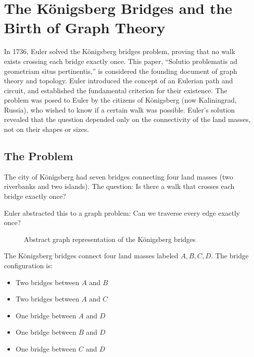 
\chapter{The K\"{o}nigsberg Bridges and the Birth of Graph Theory}

\begin{historical}
In 1736, Euler solved the K\"{o}nigsberg bridges problem, proving that no walk exists crossing
each bridge exactly once. This paper, ``Solutio problematis ad geometriam situs pertinentis,''
is considered the founding document of graph theory and topology. Euler introduced the concept
of an Eulerian path and circuit, and established the fundamental criterion for their existence.
The problem was posed to Euler by the citizens of K\"{o}nigsberg (now Kaliningrad, Russia), who
wished to know if a certain walk was possible. Euler's solution revealed that the question
depended only on the connectivity of the land masses, not on their shapes or sizes. \cite{euler1736}\end{historical}

\section{The Problem}

The city of K\"{o}nigsberg had seven bridges connecting four land masses (two riverbanks and
two islands). The question: Is there a walk that crosses each bridge exactly once?

Euler abstracted this to a graph problem: Can we traverse every edge exactly once?

\begin{figure}[H]
\centering
{}
\caption{Abstract graph representation of the K\"{o}nigsberg bridges}
\end{figure}

The K\"{o}nigsberg bridges connect four land masses labeled $A, B, C, D$. The bridge configuration is:
\begin{itemize}
\item Two bridges between $A$ and $B$
\item Two bridges between $A$ and $C$
\item One bridge between $A$ and $D$
\item One bridge between $B$ and $D$
\item One bridge between $C$ and $D$
\end{itemize}

